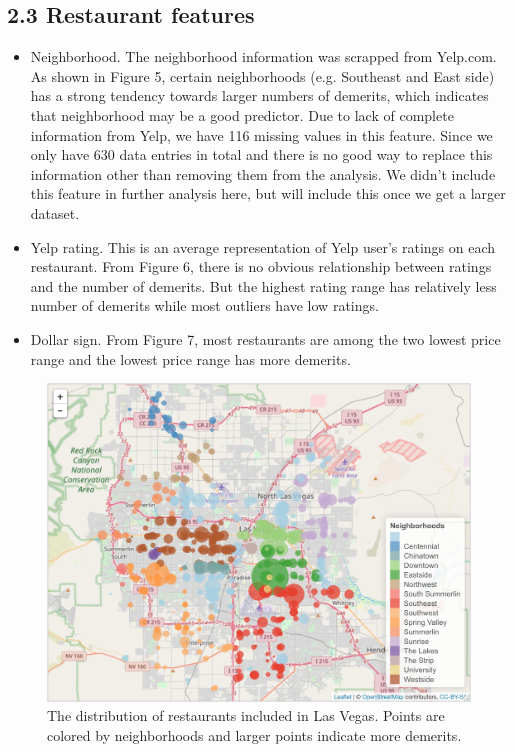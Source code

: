 \documentclass[letterpaper, 11 pt, conference]{ieeeconf}
\begin{document}
\subsection*{2.3 Restaurant features}

\begin{itemize}
	\item Neighborhood. The neighborhood information was scrapped from Yelp.com. As shown in Figure 5, certain neighborhoods (e.g. Southeast and East side) has a strong tendency towards larger numbers of demerits, which indicates that neighborhood may be a good predictor. Due to lack of complete information from Yelp, we have 116 missing values in this feature. Since we only have 630 data entries in total and there is no good way to replace this information other than removing them from the analysis. We didn't include this feature in further analysis here, but will include this once we get a larger dataset.
    \item Yelp rating. This is an average representation of Yelp user's ratings on each restaurant. From Figure 6, there is no obvious relationship between ratings and the number of demerits. But the highest rating range has relatively less number of demerits while most outliers have low ratings.
    \item Dollar sign. From Figure 7, most restaurants are among the two lowest price range and the lowest price range has more demerits.
\end{itemize}

\begin{figure}[h]
	\centering
    \includegraphics[scale=0.23]{map_demerits}
    \caption{The distribution of restaurants included in Las Vegas. Points are colored by neighborhoods and larger points indicate more demerits.}
\end{figure}
\end{document}
